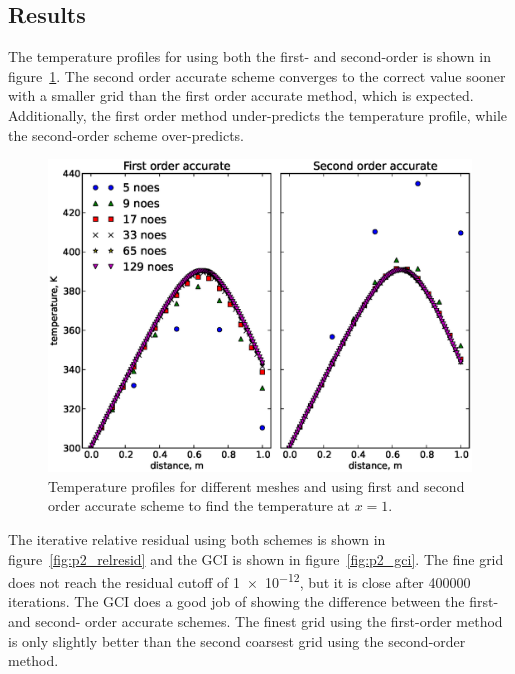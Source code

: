 \documentclass[11pt, letterpaper]{article}
\newcommand{\fig}[1]{figure~\ref{#1}}
\begin{document}

\subsection{Results}

The temperature profiles for using both the first- and second-order is shown
in \fig{fig:p2_profiles}.  The second order accurate scheme converges to the
correct value sooner with a smaller grid than the first order accurate method, which
is expected.  Additionally, the first order method under-predicts the temperature
profile, while the second-order scheme over-predicts.

\begin{figure}
	\centering
	\includegraphics[width=4.5in]{./figs/p2_profiles.eps}
	\caption{Temperature profiles for different meshes and using first and
		second order accurate scheme to find the temperature at $x=1$.}
	\label{fig:p2_profiles}
\end{figure}

The iterative relative residual using both schemes is shown in \fig{fig:p2_relresid}
and the GCI is shown in \fig{fig:p2_gci}.  The fine grid does not reach the 
residual cutoff of \num{1e-12}, but it is close after \num{400000} iterations.
The GCI does a good job of showing the difference between the first- and second- order
accurate schemes.  The finest grid using the first-order method is only slightly
better than the second coarsest grid using the second-order method.
\end{document}
